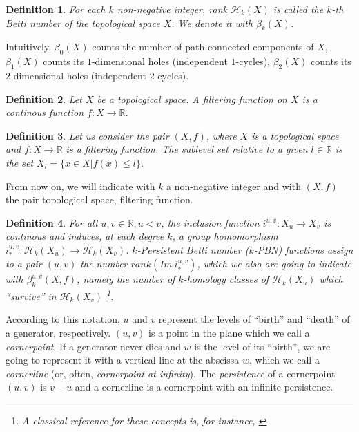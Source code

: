 \documentclass[english, LaM, oneside, noexaminfo]{sapthesis}
\newtheorem{defin}{\bf Definition}[section]
\begin{document}
\begin{defin} For each $k$ non-negative integer, rank $\mathcal{H}_k(X)$ is called the $k$-th Betti number of the topological space $X$. We denote it with $\beta_k(X)$. \end{defin}

Intuitively, $\beta_{0}(X)$ counts the number of path-connected components of $X$, $\beta_{1}(X)$ counts its $1$-dimensional holes (independent $1$-cycles), $\beta_{2}(X)$ counts its $2$-dimensional holes (independent $2$-cycles).

\begin{defin} Let $X$ be a topological space. A \textit{filtering function} on $X$ is a continous function $f: X \rightarrow \mathbb{R} $.\end{defin}

\begin{defin} \label{sublevelset} Let us consider the pair $(X, f)$, where $X$ is a topological space and $f: X \rightarrow \mathbb{R} $  is a filtering function. The \textit{sublevel set} relative to a given $l \in \mathbb{R}$ is the set $X_l = \{x \in X | f(x) \leq l\}$. \end{defin}

From now on, we will indicate with $k$ a non-negative integer and with $(X,f)$ the pair topological space, filtering function. 

\begin{defin} \label{group homomorphism} For all $u,v \in \mathbb{R}, u < v$, the inclusion function $ i^{u,v}: X_u \rightarrow X_v$ is continous and induces, at each degree $k$, a group homomorphism $i_*^{u,v}: \mathcal{H}_k(X_u) \rightarrow \mathcal{H}_k(X_v)$. \textit{$k$-Persistent Betti number ($k$-PBN)  functions} assign to a pair $(u,v)$ the number $rank (Im \ i_*^{u,v})$, which we also are going to indicate with $\beta_{k}^{u,v}(X,f)$, namely the number of $k$-homology classes of $\mathcal{H}_k(X_u)$ which ``survive'' in $\mathcal{H}_k(X_v) $ \footnote{A classical reference for these concepts is, for instance, \cite{edelsbrunner2010computational}}.\end{defin}

According to this notation, $u$ and $v$ represent the levels of ``birth'' and ``death'' of a generator, respectively. $(u,v)$ is a point in the plane which we call a \textit{cornerpoint}. If a generator never dies and $w$ is the level of its ``birth'', we are going to represent it with a vertical line at the abscissa $w$, which we call a \textit{cornerline} (or, often, \textit{cornerpoint at infinity}). The \textit{persistence} of a cornerpoint $(u,v)$ is $v-u$ and a cornerline is a cornerpoint with an infinite persistence.
\end{document}
